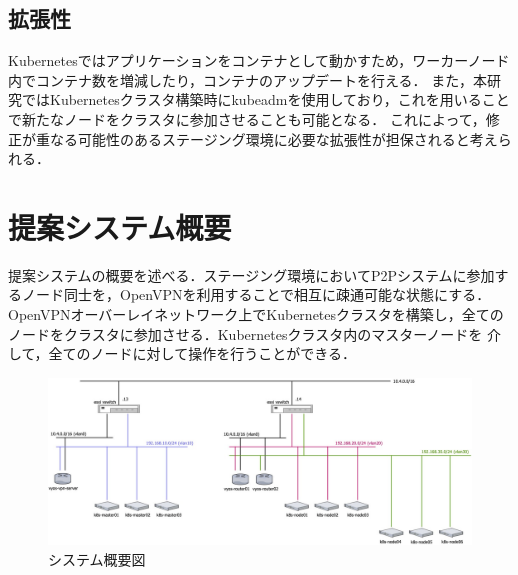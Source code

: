 \subsection{拡張性}
Kubernetesではアプリケーションをコンテナとして動かすため，ワーカーノード内でコンテナ数を増減したり，コンテナのアップデートを行える．
また，本研究ではKubernetesクラスタ構築時にkubeadmを使用しており，これを用いることで新たなノードをクラスタに参加させることも可能となる．
これによって，修正が重なる可能性のあるステージング環境に必要な拡張性が担保されると考えられる．

\section{提案システム概要}
\label{issue:about-system}
提案システムの概要を述べる．ステージング環境においてP2Pシステムに参加するノード同士を，OpenVPNを利用することで相互に疎通可能な状態にする．
OpenVPNオーバーレイネットワーク上でKubernetesクラスタを構築し，全てのノードをクラスタに参加させる．Kubernetesクラスタ内のマスターノードを
介して，全てのノードに対して操作を行うことができる．

\begin{figure}[htbp]
  \begin{center}
    \includegraphics[width=\textwidth]{./figures/system-diagram.jpg}
    \caption{システム概要図}
  \end{center}
\end{figure}

